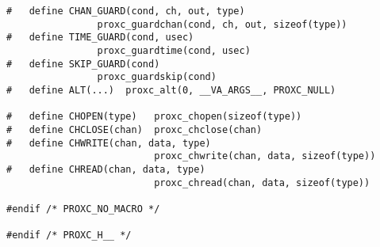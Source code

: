 \begin{lstlisting}[style=CustomC,caption={API header file for ProXC},label={lst:api_header_file_proxc}]
#   define CHAN_GUARD(cond, ch, out, type)  
                proxc_guardchan(cond, ch, out, sizeof(type))
#   define TIME_GUARD(cond, usec)           
                proxc_guardtime(cond, usec)
#   define SKIP_GUARD(cond)                 
                proxc_guardskip(cond)
#   define ALT(...)  proxc_alt(0, __VA_ARGS__, PROXC_NULL)

#   define CHOPEN(type)   proxc_chopen(sizeof(type))
#   define CHCLOSE(chan)  proxc_chclose(chan)
#   define CHWRITE(chan, data, type)  
                          proxc_chwrite(chan, data, sizeof(type))
#   define CHREAD(chan, data, type)   
                          proxc_chread(chan, data, sizeof(type)) 

#endif /* PROXC_NO_MACRO */

#endif /* PROXC_H__ */
\end{lstlisting}
